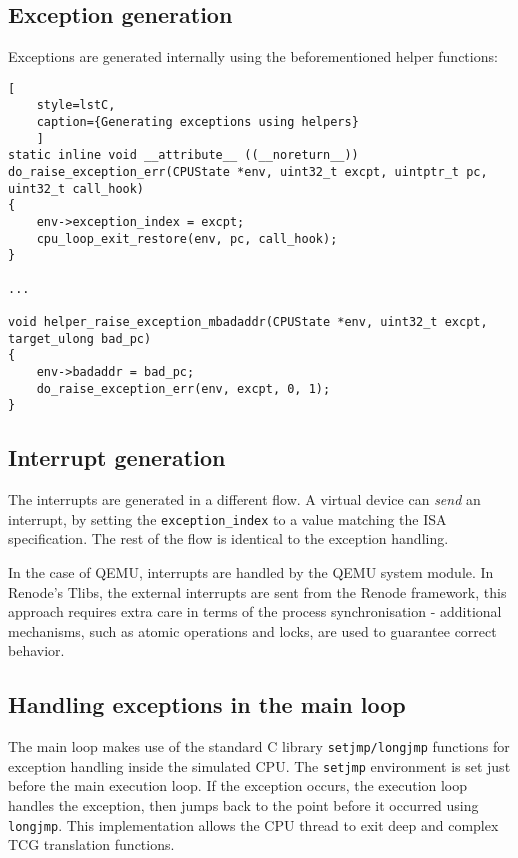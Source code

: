 \pagebreak
\subsection*{Exception generation}
Exceptions are generated internally using the beforementioned helper functions:

\begin{lstlisting}[
    style=lstC,
    caption={Generating exceptions using helpers}
    ]
static inline void __attribute__ ((__noreturn__))
do_raise_exception_err(CPUState *env, uint32_t excpt, uintptr_t pc, uint32_t call_hook)
{
    env->exception_index = excpt;
    cpu_loop_exit_restore(env, pc, call_hook);
}

...

void helper_raise_exception_mbadaddr(CPUState *env, uint32_t excpt, target_ulong bad_pc)
{
    env->badaddr = bad_pc;
    do_raise_exception_err(env, excpt, 0, 1);
}
\end{lstlisting}

\subsection*{Interrupt generation}
The interrupts are generated in a different flow. A virtual device can \textit{send} an interrupt, by setting the
\texttt{exception\_index} to a value matching the ISA specification. The rest of the flow is identical to the exception
handling.

In the case of QEMU, interrupts are handled by the QEMU system module. In Renode's Tlibs, the external
interrupts are sent from the Renode framework, this approach requires extra care in terms of the process synchronisation - 
additional mechanisms, such as atomic operations and locks, are used to guarantee correct behavior.

\subsection*{Handling exceptions in the main loop}

The main loop makes use of the standard C library \texttt{setjmp/longjmp} functions for exception handling inside the simulated CPU.
The \texttt{setjmp} environment is set just before the main execution loop. If the exception occurs, the execution loop handles
the exception, then jumps back to the point before it occurred using \texttt{longjmp}. This implementation allows
the CPU thread to exit deep and complex TCG translation functions.

